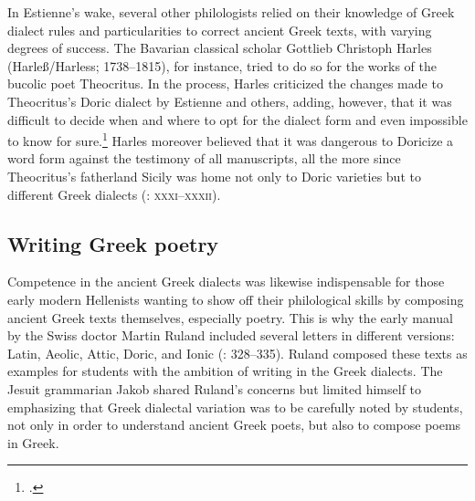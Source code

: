 In Estienne’s wake, several other philologists relied on their knowledge of Greek dialect rules and particularities to correct ancient Greek texts, with varying degrees of success. The Bavarian classical scholar Gottlieb Christoph Harles (Harleß/Harless; 1738–1815), for instance, tried to do so for the works of the bucolic poet Theocritus. In the process, Harles criticized the changes made to Theocritus’s Doric dialect by Estienne and others, adding, however, that it was difficult to decide when and where to opt for the dialect form and even impossible to know for sure.\footnote{\citet[\textsc{xxii–xxiv}]{Harles1780}.} Harles moreover believed that it was dangerous to Doricize a word form against the testimony of all manuscripts, all the more since Theocritus’s fatherland Sicily was home not only to Doric varieties but to different Greek dialects (\citealt{Harles1780}: \textsc{xxxi–xxxii}).

\subsection{Writing Greek poetry}

Competence in the ancient Greek dialects was likewise indispensable for those early modern Hellenists wanting to show off their philological skills by composing ancient Greek texts themselves, especially poetry. This is why the early manual by the Swiss doctor Martin Ruland included several letters in different versions: Latin, Aeolic, Attic, Doric, and Ionic (\citealt{Ruland1556}: 328–335). Ruland composed these texts as examples for students with the ambition of writing in the Greek dialects. The Jesuit grammarian Jakob \citet[35]{Gretser1593} shared Ruland’s concerns but limited himself to emphasizing that Greek dialectal variation was to be carefully noted by students, not only in order to understand ancient Greek poets, but also to compose poems in Greek.

